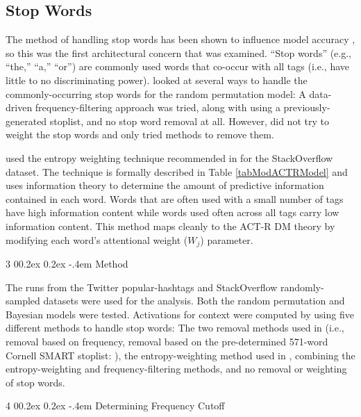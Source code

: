 \documentclass[man,floatsintext,donotrepeattitle]{apa6}
\makeatletter
\renewcommand{\subsubsection}{%
  \@startsection
  {subsubsection}%
  {3}%
  {\parindent}%
  {0\baselineskip \@plus 0.2ex \@minus 0.2ex}%
  {-.4em}%
  {\normalfont\normalsize\bfseries\addperi}}
\renewcommand{\paragraph}{%
  \@startsection
  {paragraph}%
  {4}%
  {\parindent}%
  {0\baselineskip \@plus 0.2ex \@minus 0.2ex}%
  {-.4em}%
  {\normalfont\normalsize\bfseries\itshape\addperi}}
\makeatother
\begin{document}
\subsection{Stop Words}

The method of handling stop words has been shown to influence model accuracy \parencite{Sahlgren2008,Stanley2013,Jones2007}, so this was the first architectural concern that was examined.
``Stop words'' (e.g., ``the,'' ``a,'' ``or'') are commonly used words that co-occur with all tags (i.e., have little to no discriminating power).
\textcite{Sahlgren2008} looked at several ways to handle the commonly-occurring stop words for the random permutation model:
A data-driven frequency-filtering approach was tried, along with using a previously-generated stoplist, and no stop word removal at all.
However, \citeauthor{Sahlgren2008} did not try to weight the stop words and only tried methods to remove them.

\textcite{Stanley2013} used the entropy weighting technique recommended in \textcite{Dumais1991} for the StackOverflow dataset.
The technique is formally described in Table \ref{tabModACTRModel} and uses information theory to determine the amount of predictive information contained in each word.
Words that are often used with a small number of tags have high information content while words used often across all tags carry low information content.
This method maps cleanly to the ACT-R DM theory by modifying each word's attentional weight ($W_{j}$) parameter.

\subsubsection{Method}

The runs from the Twitter popular-hashtags and StackOverflow randomly-sampled datasets were used for the analysis.
Both the random permutation and Bayesian models were tested.
Activations for context were computed by using five different methods to handle stop words:
The two removal methods used in \textcite{Sahlgren2008}
(i.e., removal based on frequency, removal based on the pre-determined 571-word Cornell SMART stoplist: ),
the entropy-weighting method used in \textcite{Stanley2013},
combining the entropy-weighting and frequency-filtering methods,
and no removal or weighting of stop words.

\paragraph{Determining Frequency Cutoff}
\end{document}
